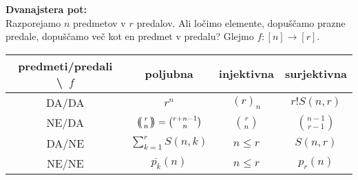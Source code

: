 \documentclass[a4paper, oneside, 12pt]{article}
\theoremstyle{definition}
\def\multiset#1#2{\ensuremath{\left(\kern-.3em\left(\genfrac{}{}{0pt}{}{#1}{#2}\right)\kern-.3em\right)}}
\begin{document}


\textbf{Dvanajstera pot:}\\
Razporejamo $n$ predmetov v $r$ predalov. Ali ločimo elemente,
dopuščamo prazne predale, dopuščamo več kot en predmet v predalu?  Glejmo
$f\colon[n] \to [r]$.

\begin{tabular}{|c|c|c|c|}
  \hline
  predmeti/predali \textbackslash\ $f$ & poljubna & injektivna & surjektivna \\ \hline
  DA/DA & $r^n$ & $(r)_n$ & $r!S(n, r)$ \\ \hline
  NE/DA & $\multiset{r}{n} = \binom{r+n-1}{n}$ & $\binom{r}{n}$ & $\binom{n-1}{r-1}$ \\ \hline
  DA/NE & $\sum_{k=1}^rS(n, k)$ & $n \leq r$ & $S(n, r)$ \\ \hline
  NE/NE & $\overline{p_k}(n)$ & $n \leq r$ & $p_r(n)$ \\ \hline
\end{tabular}

\end{document}
